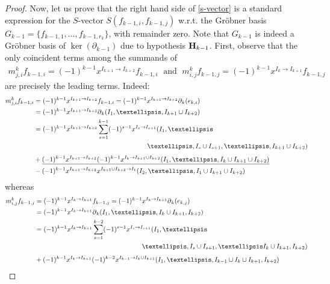 \documentclass[10pt]{amsart}
\newcommand{\mbfh}{\mbox{${\bf H}$}}
\newcommand{\dif}{\mbox{$\partial$}}
\theoremstyle{definition}
\theoremstyle{remark}
\begin{document}
\begin{proof}
Now, let us prove that the right hand side of \eqref{s-vector} is a
standard expression for the $S$-vector $S(f_{k-1,i},f_{k-1,j})$
w.r.t. the Gr\"obner basis $G_{k-1}=\{f_{k-1,1},\ldots
,f_{k-1,r_{k}}\}$, with remainder zero. Note that $G_{k-1}$ is indeed
a Gr\"obner basis of $\ker(\dif_{k-1})$ due to hypothesis
$\mbfh_{k-1}$.  First, observe that the only coincident terms among
the summands of
\begin{eqnarray*}
m^{k}_{j,i}f_{k-1,i}=(-1)^{k-1}x^{I_{k+1}\to I_{k+2}}f_{k-1,i}\;\mbox{ and }\;
m^{k}_{i,j}f_{k-1,j}=(-1)^{k-1}x^{I_{k}\to I_{k+1}}f_{k-1,j}
\end{eqnarray*}
are precisely the leading terms. Indeed: 
\begin{align}\label{fi}
m^{k}_{j,i}f_{k-1,i}&=(-1)^{k-1}x^{I_{k+1}\to
  I_{k+2}}f_{k-1,i}=(-1)^{k-1}x^{I_{k+1}\to
  I_{k+2}}\dif_{k}(e_{k,i})\notag \\ 
&= (-1)^{k-1}x^{I_{k+1}\to
  I_{k+2}}\dif_{k}(I_1,\ldots ,I_{k+1}\cup
I_{k+2}) \notag \\
&= (-1)^{k-1}x^{I_{k+1}\to
  I_{k+2}}\sum_{s=1}^{k-1}(-1)^{s-1}x^{I_s\to I_{s+1}}(I_1,\ldots\\
&\phantom{(-1)^{k-1}x^{I_{k+1}\to
  I_{k+2}}\lim_{s=1}(-1)^{s-1}x^{I_s\to I_{s+1}}}\dots,I_s\cup I_{s+1},\ldots ,I_{k+1}\cup I_{k+2})\notag
\\
&+ \underline{(-1)^{k-1}x^{I_{k+1}\to I_{k+2}}(-1)^{k-1}x^{I_{k}\to
    I_{k+1}\cup I_{k+2}}(I_1,\ldots ,I_{k}\cup I_{k+1}\cup
  I_{k+2})}\notag \\ 
& -(-1)^{k-1}x^{I_{k+1}\to I_{k+2}}x^{I_{k+1}\cup I_{k+2}\to
  I_1}(I_2,\ldots,I_1\cup I_{k+1}\cup I_{k+2})\notag
\end{align}
whereas 
\begin{align}\label{fj}
 m^{k}_{i,j}f_{k-1,j}&=(-1)^{k-1}x^{I_{k}\to I_{k+1}}f_{k-1,j}=
  (-1)^{k-1}x^{I_{k}\to I_{k+1}}\dif_{k}(e_{k,j}) \notag \\ 
&=  (-1)^{k-1}x^{I_{k}\to I_{k+1}}\dif_{k}(I_1,\ldots ,I_{k}\cup
  I_{k+1},I_{k+2}) \notag \\
&= (-1)^{k-1}x^{I_{k}\to
    I_{k+1}}\sum_{s=1}^{k-2}(-1)^{s-1}x^{I_s\to I_{s+1}}(I_1,\ldots
  \\
	&\phantom{(-1)^{k-1}x^{I_{k}\to
    I_{k+1}}\lim_{s=1}(-1)^{s-1}x^{I_s\to I_{s+1}}}\ldots, I_s\cup I_{s+1}, \dots I_{k}\cup I_{k+1}, I_{k+2})\notag\\ 
&+  (-1)^{k-1}x^{I_{k}\to I_{k+1}}(-1)^{k-2}x^{I_{k-1}\to I_{k}\cup
    I_{k+1}} (I_1,\ldots , I_{k-1}\cup I_{k}\cup I_{k+1}, I_{k+2})\notag
 \\

\end{align}
\end{proof}
\end{document}
